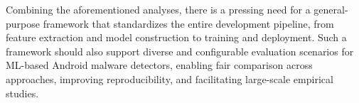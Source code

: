 Combining the aforementioned analyses, there is a pressing need for a general-purpose framework that standardizes the entire development pipeline, from feature extraction and model construction to training and deployment.
Such a framework should also support diverse and configurable evaluation scenarios for ML-based Android malware detectors, enabling fair comparison across approaches, improving reproducibility, and facilitating large-scale empirical studies.








